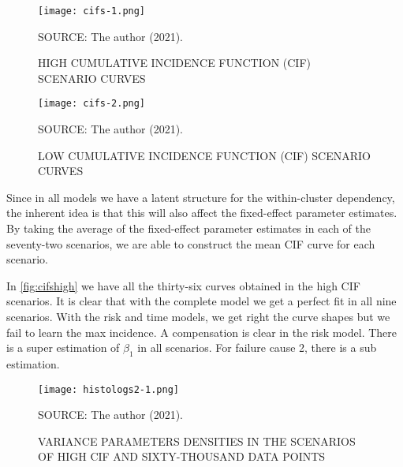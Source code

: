 \begin{figure}[H]
 \setlength{\abovecaptionskip}{.0001pt}
 \caption{HIGH CUMULATIVE INCIDENCE FUNCTION (CIF) SCENARIO CURVES}
 \vspace{0.2cm}\centering
 \texttt{[image: cifs-1.png]}\\
 \begin{footnotesize}
  SOURCE: The author (2021).
 \end{footnotesize}
 \label{fig:cifshigh}
\end{figure}

\begin{figure}[H]
 \setlength{\abovecaptionskip}{.0001pt}
 \caption{LOW CUMULATIVE INCIDENCE FUNCTION (CIF) SCENARIO CURVES}
 \vspace{0.2cm}\centering
 \texttt{[image: cifs-2.png]}\\
 \begin{footnotesize}
  SOURCE: The author (2021).
 \end{footnotesize}
 \label{fig:cifslow}
\end{figure}

Since in all models we have a latent structure for the within-cluster
dependency, the inherent idea is that this will also affect the
fixed-effect parameter estimates. By taking the average of the
fixed-effect parameter estimates in each of the seventy-two scenarios,
we are able to construct the mean CIF curve for each scenario.

In \autoref{fig:cifshigh} we have all the thirty-six curves obtained in
the high CIF scenarios. It is clear that with the complete model we get
a perfect fit in all nine scenarios. With the risk and time models, we
get right the curve shapes but we fail to learn the max incidence. A
compensation is clear in the risk model. There is a super estimation of
\(\beta_{1}\) in all scenarios. For failure cause 2, there is a sub
estimation.

\begin{figure}[H]
 \setlength{\abovecaptionskip}{.0001pt}
 \caption{VARIANCE PARAMETERS DENSITIES IN THE SCENARIOS OF HIGH CIF AND
          SIXTY-THOUSAND DATA POINTS}
 \vspace{0.2cm}\centering
 \texttt{[image: histologs2-1.png]}\\
 \begin{footnotesize}
  SOURCE: The author (2021).
 \end{footnotesize}
 \label{fig:histologs2}
\end{figure}

